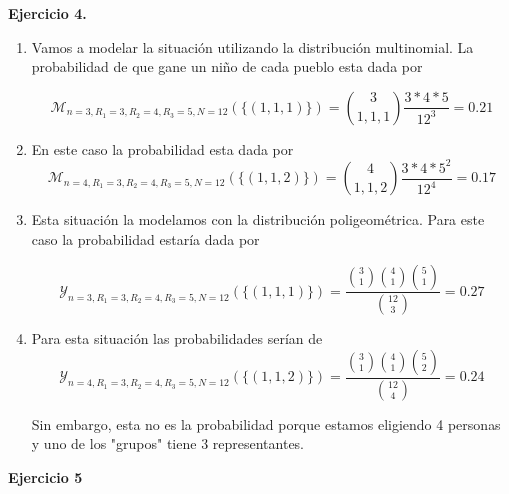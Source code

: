 \documentclass[letter,twoside,12pt]{article}
\begin{document}
\textbf{Ejercicio 4.}
\begin{enumerate}[label=\textbf{\arabic*)}]
\item Vamos a modelar la situación utilizando la distribución multinomial. La probabilidad de que gane un niño de cada pueblo esta dada por

\begin{equation}
\mathcal{M}_{n=3,R_1=3,R_2=4,R_3=5,N=12}(\{(1,1,1)\})=\binom{3}{1,1,1}\frac{3*4*5}{12^3}=0.21 \nonumber
\end{equation}

\item En este caso la probabilidad esta dada por 
\begin{equation}
\mathcal{M}_{n=4,R_1=3,R_2=4,R_3=5,N=12}(\{(1,1,2)\})=\binom{4}{1,1,2}\frac{3*4*5^2}{12^4}=0.17 \nonumber
\end{equation}

\item Esta situación la modelamos con la distribución poligeométrica. Para este caso la probabilidad estaría dada por

\begin{equation}
\mathcal{Y}_{n=3,R_1=3,R_2=4,R_3=5,N=12}(\{(1,1,1)\})=\frac{\binom{3}{1}\binom{4}{1}\binom{5}{1}}{\binom{12}{3}} = 0.27\nonumber
\end{equation}

\item Para esta situación las probabilidades serían de
\begin{equation}
\mathcal{Y}_{n=4,R_1=3,R_2=4,R_3=5,N=12}(\{(1,1,2)\})=\frac{\binom{3}{1}\binom{4}{1}\binom{5}{2}}{\binom{12}{4}} = 0.24\nonumber
\end{equation}

Sin embargo, esta no es la probabilidad porque estamos eligiendo 4 personas y uno de los "grupos" tiene 3 representantes.
\end{enumerate}
\textbf{Ejercicio 5}
\end{document}
